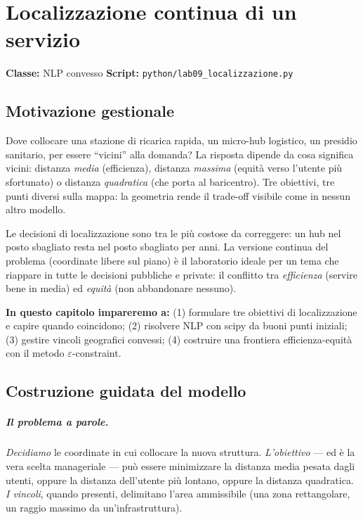 \chapter{Localizzazione continua di un servizio}
\label{cap:localizzazione}

\noindent\textbf{Classe:} NLP convesso \hfill
\textbf{Script:} \texttt{python/lab09\_localizzazione.py}

\section{Motivazione gestionale}

Dove collocare una stazione di ricarica rapida, un micro-hub logistico, un presidio
sanitario, per essere ``vicini'' alla domanda? La risposta dipende da cosa significa
vicini: distanza \emph{media} (efficienza), distanza \emph{massima} (equità verso
l'utente più sfortunato) o distanza \emph{quadratica} (che porta al baricentro).
Tre obiettivi, tre punti diversi sulla mappa: la geometria rende il trade-off visibile
come in nessun altro modello.



Le decisioni di localizzazione sono tra le più costose da correggere: un hub nel
posto sbagliato resta nel posto sbagliato per anni. La versione continua del
problema (coordinate libere sul piano) è il laboratorio ideale per un tema che
riappare in tutte le decisioni pubbliche e private: il conflitto tra
\emph{efficienza} (servire bene in media) ed \emph{equità} (non abbandonare
nessuno).

\textbf{In questo capitolo impareremo a:} (1) formulare tre obiettivi di
localizzazione e capire quando coincidono; (2) risolvere NLP con scipy da buoni
punti iniziali; (3) gestire vincoli geografici convessi; (4) costruire una
frontiera efficienza-equità con il metodo $\varepsilon$-constraint.

\section{Costruzione guidata del modello}

\paragraph{Il problema a parole.} \emph{Decidiamo} le coordinate in cui collocare la
nuova struttura. \emph{L'obiettivo} --- ed è la vera scelta manageriale --- può essere
minimizzare la distanza media pesata dagli utenti, oppure la distanza dell'utente più
lontano, oppure la distanza quadratica. \emph{I vincoli}, quando presenti, delimitano
l'area ammissibile (una zona rettangolare, un raggio massimo da un'infrastruttura).

